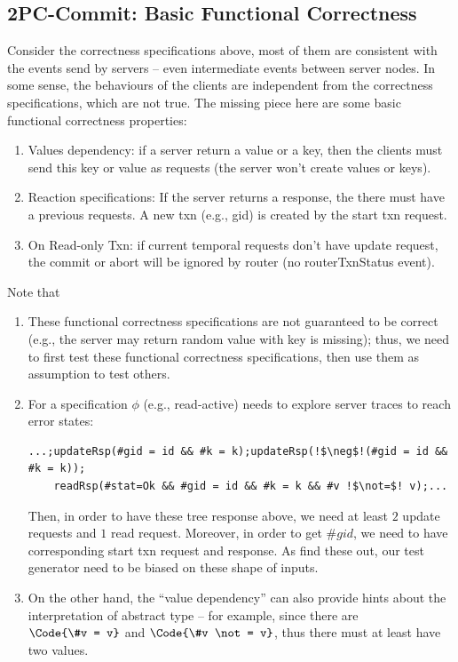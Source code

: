 \subsection{2PC-Commit: Basic Functional Correctness}

Consider the correctness specifications above, most of them are consistent with the events send by servers -- even intermediate events between server nodes. In some sense, the behaviours of the clients are independent from the correctness specifications, which are not true. The missing piece here are some basic functional correctness properties:
\begin{enumerate}
    \item Values dependency: if a server return a value or a key, then the clients must send this key or value as requests (the server won't create values or keys).
    \item Reaction specifications: If the server returns a response, the there must have a previous requests. A new txn (e.g., gid) is created by the start txn request.
    \item On Read-only Txn: if current temporal requests don't have update request, the commit or abort will be ignored by router (no routerTxnStatus event).
\end{enumerate}
Note that
\begin{enumerate}
    \item These functional correctness specifications are not guaranteed to be correct (e.g., the server may return random value with key is missing); thus, we need to first test these functional correctness specifications, then use them as assumption to test others.
    \item For a specification $\phi$ (e.g., read-active) needs to explore server traces to reach error states:
\begin{verbatim}
...;updateRsp(#gid = id && #k = k);updateRsp(!$\neg$!(#gid = id && #k = k));
    readRsp(#stat=Ok && #gid = id && #k = k && #v !$\not=$! v);...
\end{verbatim}

Then, in order to have these tree response above, we need at least $2$ update requests and $1$ read request. Moreover, in order to get $\#gid$, we need to have corresponding start txn request and response. As find these out, our test generator need to be biased on these shape of inputs. 
    \item On the other hand, the ``value dependency'' can also provide hints about the interpretation of abstract type -- for example, since there are $\Code{\#v = v}$ and $\Code{\#v \not= v}$, thus there must at least have two values.
\end{enumerate}

